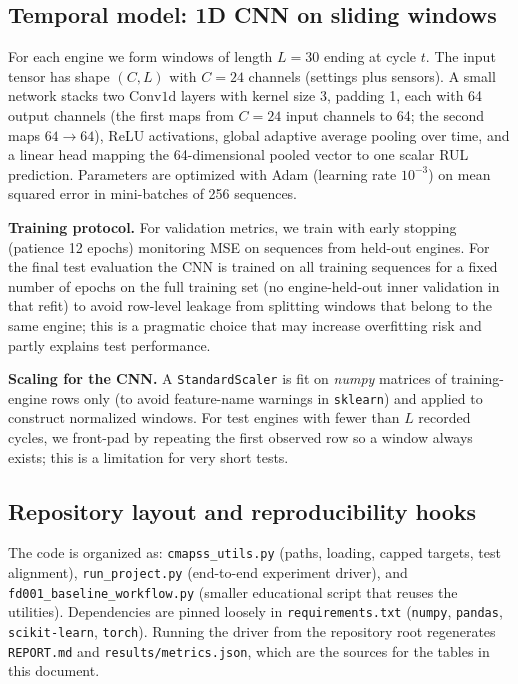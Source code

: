 \documentclass[11pt]{article}
\begin{document}
\subsection{Temporal model: 1D CNN on sliding windows}
For each engine we form windows of length $L=30$ ending at cycle $t$. The input tensor has shape $(C, L)$ with $C=24$ channels (settings plus sensors). A small network stacks two $\mathrm{Conv1d}$ layers with kernel size 3, padding 1, each with 64 output channels (the first maps from $C{=}24$ input channels to 64; the second maps $64 \rightarrow 64$), ReLU activations, global adaptive average pooling over time, and a linear head mapping the 64-dimensional pooled vector to one scalar RUL prediction. Parameters are optimized with Adam (learning rate $10^{-3}$) on mean squared error in mini-batches of 256 sequences.

\textbf{Training protocol.} For validation metrics, we train with early stopping (patience 12 epochs) monitoring MSE on sequences from held-out engines. For the final test evaluation the CNN is trained on all training sequences for a fixed number of epochs on the full training set (no engine-held-out inner validation in that refit) to avoid row-level leakage from splitting windows that belong to the same engine; this is a pragmatic choice that may increase overfitting risk and partly explains test performance.

\textbf{Scaling for the CNN.} A \texttt{StandardScaler} is fit on \emph{numpy} matrices of training-engine rows only (to avoid feature-name warnings in \texttt{sklearn}) and applied to construct normalized windows. For test engines with fewer than $L$ recorded cycles, we front-pad by repeating the first observed row so a window always exists; this is a limitation for very short tests.

\subsection{Repository layout and reproducibility hooks}
The code is organized as: \texttt{cmapss\_utils.py} (paths, loading, capped targets, test alignment), \texttt{run\_project.py} (end-to-end experiment driver), and \texttt{fd001\_baseline\_workflow.py} (smaller educational script that reuses the utilities). Dependencies are pinned loosely in \texttt{requirements.txt} (\texttt{numpy}, \texttt{pandas}, \texttt{scikit-learn}, \texttt{torch}). Running the driver from the repository root regenerates \texttt{REPORT.md} and \texttt{results/metrics.json}, which are the sources for the tables in this document.
\end{document}
